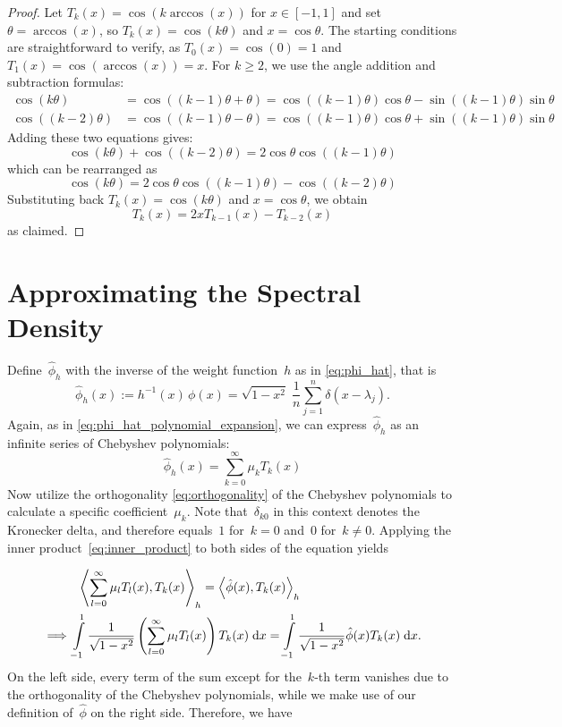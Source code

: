 \begin{proof}
Let $T_k(x) = \cos(k \arccos(x))$ for $x \in [-1, 1]$ and set $\theta = \arccos(x)$, so $\mbox{$T_k(x) = \cos(k\theta)$}$ and $x = \cos\theta$. The starting conditions are straightforward to verify, as $T_0(x) = \cos(0) = 1$ and $T_1(x) = \cos(\arccos(x)) = x$. For $k \geq 2$, we use the angle addition and subtraction formulas:
\begin{align*}
\cos(k\theta) &= \cos((k-1)\theta + \theta) = \cos((k-1)\theta)\cos\theta - \sin((k-1)\theta)\sin\theta \\
\cos((k-2)\theta) &= \cos((k-1)\theta - \theta) = \cos((k-1)\theta)\cos\theta + \sin((k-1)\theta)\sin\theta
\end{align*}
Adding these two equations gives:
\[
\cos(k\theta) + \cos((k-2)\theta) = 2\cos\theta \cos((k-1)\theta)
\]
which can be rearranged as
\[
\cos(k\theta) = 2\cos\theta \cos((k-1)\theta) - \cos((k-2)\theta)
\]
Substituting back $T_k(x) = \cos(k\theta)$ and $x = \cos\theta$, we obtain
\[
T_k(x) = 2x T_{k-1}(x) - T_{k-2}(x)
\]
as claimed.
\end{proof}

\section{Approximating the Spectral Density}
Define~$\hat{\phi}_h$ with the inverse of the weight function~$h$ as in \eqref{eq:phi_hat}, that is
\[
    \hat{\phi}_h(x) := h^{-1}(x) \, \phi(x) = \sqrt{1 - x^2} \; \frac{1}{n} \sum_{j = 1}^n \delta(x - \lambda_j).
\]
Again, as in \eqref{eq:phi_hat_polynomial_expansion}, we can express~$\hat{\phi}_h$ as an infinite series of Chebyshev polynomials:
\[
    \hat{\phi}_h(x) = \sum_{k = 0}^{\infty} \mu_k T_k(x)
\]
Now utilize the orthogonality \eqref{eq:orthogonality} of the Chebyshev polynomials to calculate a specific coefficient~$\mu_k$.
Note that~$\delta_{k0}$ in this context denotes the Kronecker delta, and therefore equals~$1$ for~$k = 0$ and~$0$ for~$k \neq 0$. Applying the inner product~\eqref{eq:inner_product} to both sides of the equation yields

\begin{align*}
    & \; \; \left \langle \sum_{l = 0}^{\infty} \mu_l T_l(x), T_k(x) \right \rangle_h = \left \langle \hat{\phi}(x), T_k(x) \right \rangle_h \\
    \implies & \int\limits_{-1}^1 \frac{1}{\sqrt{1 - x^2}} \left(\sum_{l = 0}^{\infty} \mu_l T_l(x)\right) T_k(x) \;\mathrm{d}x = \int\limits_{-1}^1 \frac{1}{\sqrt{1 - x^2}} \hat{\phi}(x) T_k(x) \;\mathrm{d}x.\\
\end{align*}On the left side, every term of the sum except for the~$k$-th term vanishes due to the orthogonality of the Chebyshev polynomials, while we make use of our definition of~$\hat{\phi}$ on the right side. Therefore, we have


